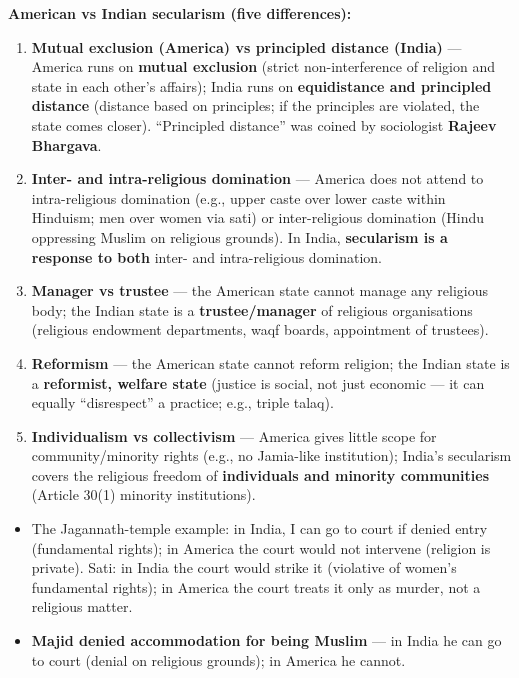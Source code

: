 \begin{ComparisonBox}
\textbf{American vs Indian secularism (five differences):}
\begin{enumerate}
\item \textbf{Mutual exclusion (America) vs principled distance (India)} --- America runs on \textbf{mutual exclusion} (strict non-interference of religion and state in each other's affairs); India runs on \textbf{equidistance and principled distance} (distance based on principles; if the principles are violated, the state comes closer). ``Principled distance'' was coined by sociologist \textbf{Rajeev Bhargava}.
\item \textbf{Inter- and intra-religious domination} --- America does not attend to intra-religious domination (e.g., upper caste over lower caste within Hinduism; men over women via sati) or inter-religious domination (Hindu oppressing Muslim on religious grounds). In India, \textbf{secularism is a response to both} inter- and intra-religious domination.
\item \textbf{Manager vs trustee} --- the American state cannot manage any religious body; the Indian state is a \textbf{trustee/manager} of religious organisations (religious endowment departments, waqf boards, appointment of trustees).
\item \textbf{Reformism} --- the American state cannot reform religion; the Indian state is a \textbf{reformist, welfare state} (justice is social, not just economic --- it can equally ``disrespect'' a practice; e.g., triple talaq).
\item \textbf{Individualism vs collectivism} --- America gives little scope for community/minority rights (e.g., no Jamia-like institution); India's secularism covers the religious freedom of \textbf{individuals and minority communities} (Article 30(1) minority institutions).
\end{enumerate}
\end{ComparisonBox}

\begin{ExampleBox}
\begin{itemize}
\item The Jagannath-temple example: in India, I can go to court if denied entry (fundamental rights); in America the court would not intervene (religion is private). Sati: in India the court would strike it (violative of women's fundamental rights); in America the court treats it only as murder, not a religious matter.
\item \textbf{Majid denied accommodation for being Muslim} --- in India he can go to court (denial on religious grounds); in America he cannot.
\end{itemize}
\end{ExampleBox}

